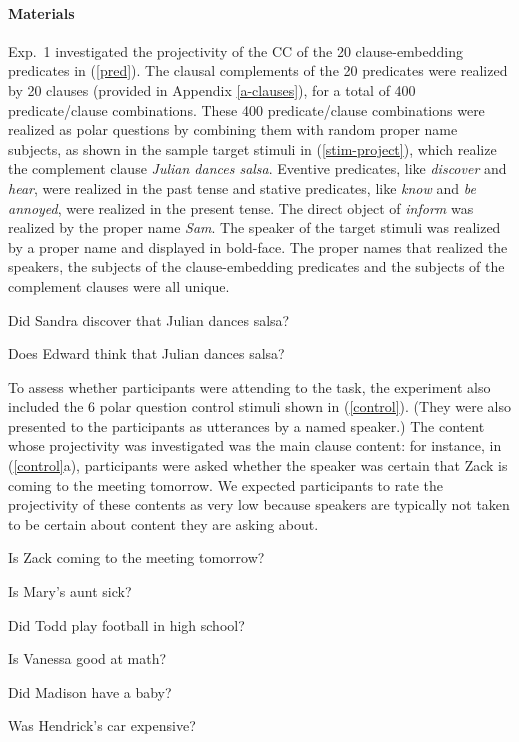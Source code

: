 \documentclass[11pt,fleqn]{article}
\newcommand{\6}{\mbox{$[\hspace*{-.6mm}[$}}
\newcommand{\9}{\mbox{$]\hspace*{-.6mm}]$}}
\begin{document}
\paragraph{Materials} Exp.~1 investigated the projectivity of the CC of the 20 clause-embedding predicates in (\ref{pred}).  The clausal complements of the 20 predicates were realized by 20 clauses (provided in Appendix \ref{a-clauses}), for a total of 400 predicate/clause combinations. These 400 predicate/clause combinations were realized as polar questions by combining them with random proper name subjects, as shown in the sample target stimuli in (\ref{stim-project}), which realize the complement clause {\em Julian dances salsa}. Eventive predicates, like {\em discover} and {\em hear}, were realized in the past tense and stative predicates, like {\em know} and {\em be annoyed}, were realized in the present tense. The direct object of {\em inform} was realized by the proper name {\em Sam}.  The speaker of the target stimuli was realized by a proper name and displayed in bold-face. The proper names that realized the speakers, the subjects of the clause-embedding predicates and the subjects of the complement clauses were all unique.

\begin{exe}
\ex\label{stim-project} 
\begin{xlist}
 Did Sandra discover that Julian dances salsa?

 Does Edward think that Julian dances salsa?
\end{xlist}
\end{exe}

To assess whether participants were attending to the task, the experiment also included the 6  polar question control stimuli shown in (\ref{control}). (They were also presented to the participants as utterances by a named speaker.) The content whose projectivity was investigated was the main clause content: for instance, in (\ref{control}a), participants were asked whether the speaker was certain that Zack is coming to the meeting tomorrow. We expected participants to rate the projectivity of these contents as very low because speakers are typically not taken to be certain about content they are asking about.

\begin{exe}
\ex\label{control} 
\begin{xlist}

\ex   Is Zack coming to the meeting tomorrow?

\ex Is Mary's aunt sick?

\ex Did Todd play football in high school?

\ex Is Vanessa good at math?

\ex Did Madison have a baby?

\ex Was Hendrick's car expensive?

\end{xlist}
\end{exe}
\end{document}
